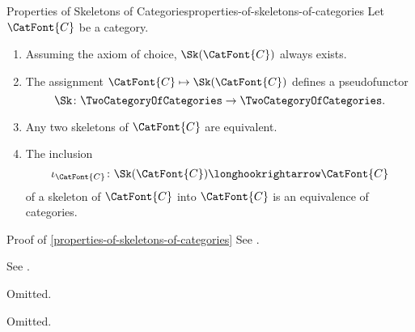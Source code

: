 \begin{proposition}{Properties of Skeletons of Categories}{properties-of-skeletons-of-categories}%
    Let $\CatFont{C}$ be a category.
    \begin{enumerate}
        \item\label{properties-of-skeletons-of-categories-existence}Assuming the axiom of choice, $\Sk(\CatFont{C})$ always exists.
        \item\label{properties-of-skeletons-of-categories-pseudofunctoriality}The assignment $\CatFont{C}\mapsto\Sk(\CatFont{C})$ defines a pseudofunctor
            \[%
                \Sk%
                \colon%
                \TwoCategoryOfCategories%
                \to%
                \TwoCategoryOfCategories.%
            \]%
        \item\label{properties-of-skeletons-of-categories-uniqueness-up-to-equivalence}Any two skeletons of $\CatFont{C}$ are equivalent.
        \item\label{properties-of-skeletons-of-categories-inclusions-of-skeletons-are-equivalences}The inclusion
            \[
                \iota_{\CatFont{C}}%
                \colon%
                \Sk(\CatFont{C})%
                \longhookrightarrow%
                \CatFont{C}
            \]%
            of a skeleton of $\CatFont{C}$ into $\CatFont{C}$ is an equivalence of categories.
    \end{enumerate}
\end{proposition}
\begin{Proof}{Proof of \cref{properties-of-skeletons-of-categories}}%
    See \cite[Section ]{nlab:skeleton}.

    See \cite[Section ]{nlab:skeleton}.

    Omitted.

    Omitted.
\end{Proof}
